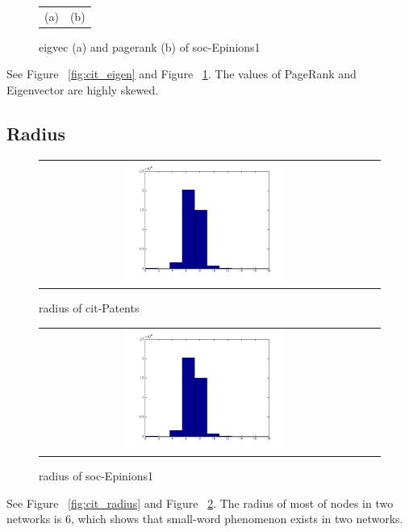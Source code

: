 \begin{figure}[htbf]
\begin{center}
\begin{tabular}{cc}
    (a) & (b) 
\end{tabular}
\caption{ eigvec (a) and pagerank (b) of soc-Epinions1}
\label{fig:soc_eigen}
\end{center}
\end{figure}

See Figure ~\ref{fig:cit_eigen}  and Figure ~\ref{fig:soc_eigen}. The values of PageRank and Eigenvector are highly skewed.

\subsection{Radius}

\begin{figure}[htbf]
\begin{center}
\begin{tabular}{cc}
     \includegraphics[width=0.5\textwidth]{FIG/cit_result/radius.png} \\
\end{tabular}
\caption{radius of cit-Patents}
\label{fig:cit_radius}
\begin{tabular}{cc}
     \includegraphics[width=0.5\textwidth]{FIG/cit_result/radius.png} \\
\end{tabular}
\caption{radius of soc-Epinions1}
\label{fig:soc_radius}
\end{center}
\end{figure}

See Figure ~\ref{fig:cit_radius} and Figure ~\ref{fig:soc_radius}. The radius of most of nodes in two networks is 6, which shows that small-word phenomenon exists in two networks. 
